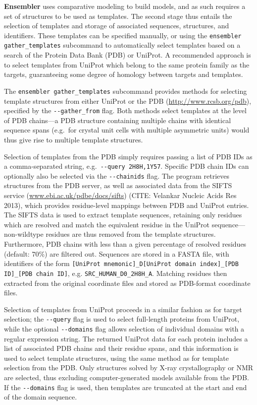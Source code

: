 \documentclass[aps,pre,twocolumn,nofootinbib,superscriptaddress,linenumbers]{revtex4-1}
\begin{document}
{\bf Ensembler} uses comparative modeling to build models, and as such requires a set of structures to be used as templates.
The second stage thus entails the selection of templates and storage of associated sequences, structures, and identifiers.
These templates can be specified manually, or using the {\tt ensembler gather\_templates} subcommand to automatically select templates based on a search of the Protein Data Bank (PDB) or UniProt.
A recommended approach is to select templates from UniProt which belong to the same protein family as the targets, guaranteeing some degree of homology between targets and templates.

The {\tt ensembler gather\_templates} subcommand provides methods for selecting template structures from either UniProt or the PDB (\url{http://www.rcsb.org/pdb}), specified by the {\tt -{}-gather\_from} flag.
Both methods select templates at the level of PDB chains---a PDB structure containing multiple chains with identical sequence spans (e.g.~for crystal unit cells with multiple asymmetric units) would thus give rise to multiple template structures.

Selection of templates from the PDB simply requires passing a list of PDB IDs as a comma-separated string, e.g.~{\tt -{}-query 2H8H,1Y57}.
Specific PDB chain IDs can optionally also be selected via the {\tt -{}-chainids} flag.
The program retrieves structures from the PDB server, as well as associated data from the SIFTS service (\href{http://www.ebi.ac.uk/pdbe/docs/sifts/}{www.ebi.ac.uk/pdbe/docs/sifts}) (CITE: Velankar Nucleic Acids Res 2013), which provides residue-level mappings between PDB and UniProt entries.
The SIFTS data is used to extract template sequences, retaining only residues which are resolved and match the equivalent residue in the UniProt sequence---non-wildtype residues are thus removed from the template structures.
Furthermore, PDB chains with less than a given percentage of resolved residues (default: 70\%) are filtered out.
Sequences are stored in a FASTA file, with identifiers of the form {\tt [UniProt mnemonic]\_D[UniProt domain index]\_[PDB ID]\_[PDB chain ID]}, e.g. {\tt SRC\_HUMAN\_D0\_2H8H\_A}.
Matching residues then extracted from the original coordinate files and stored as PDB-format coordinate files.

Selection of templates from UniProt proceeds in a similar fashion as for target selection; the {\tt -{}-query} flag is used to select full-length proteins from UniProt, while the optional {\tt -{}-domains} flag allows selection of individual domains with a regular expression string.
The returned UniProt data for each protein includes a list of associated PDB chains and their residue spans, and this information is used to select template structures, using the same method as for template selection from the PDB.
Only structures solved by X-ray crystallography or NMR are selected, thus excluding computer-generated models available from the PDB.
If the {\tt -{}-domains} flag is used, then templates are truncated at the start and end of the domain sequence.
\end{document}
